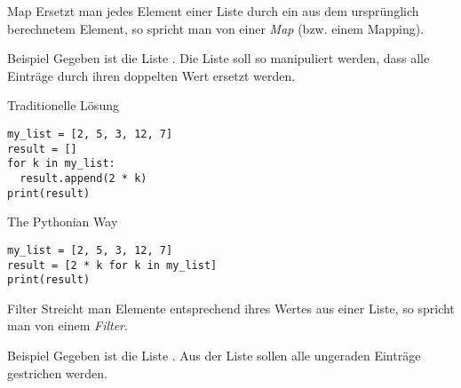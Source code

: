 \begin{frame}
\begin{block}{Map}
\vspace{2pt}
Ersetzt man jedes Element einer Liste durch ein aus dem ursprünglich berechnetem Element, so spricht man von einer \emph{Map} (bzw. einem Mapping). 
\end{block}

\pause 

\vspace{12pt}

\begin{exampleblock}{Beispiel}
\vspace{2pt}
Gegeben ist die Liste . Die Liste soll so manipuliert werden, dass alle Einträge durch ihren doppelten Wert ersetzt werden. 
\end{exampleblock}

\end{frame}

\begin{fragile}
\begin{overprint}

\begin{block}{Traditionelle Lösung}
\vspace{2pt}
\begin{verbatim}
my_list = [2, 5, 3, 12, 7]
result = []
for k in my_list: 
  result.append(2 * k)
print(result)
\end{verbatim}
\end{block}

\vspace{12pt}

\pause

\begin{block}{The Pythonian Way}
\vspace{2pt}
\begin{verbatim}
my_list = [2, 5, 3, 12, 7]
result = [2 * k for k in my_list]
print(result)
\end{verbatim}
\end{block}
\end{overprint}


\end{fragile}

\begin{frame}
\begin{block}{Filter}
\vspace{2pt}
Streicht man Elemente entsprechend ihres Wertes aus einer Liste, so spricht man von einem \emph{Filter}. 
\end{block}

\pause 

\vspace{12pt}

\begin{exampleblock}{Beispiel}
\vspace{2pt}
Gegeben ist die Liste . Aus der Liste sollen alle ungeraden Einträge gestrichen werden. 
\end{exampleblock}

\end{frame}

